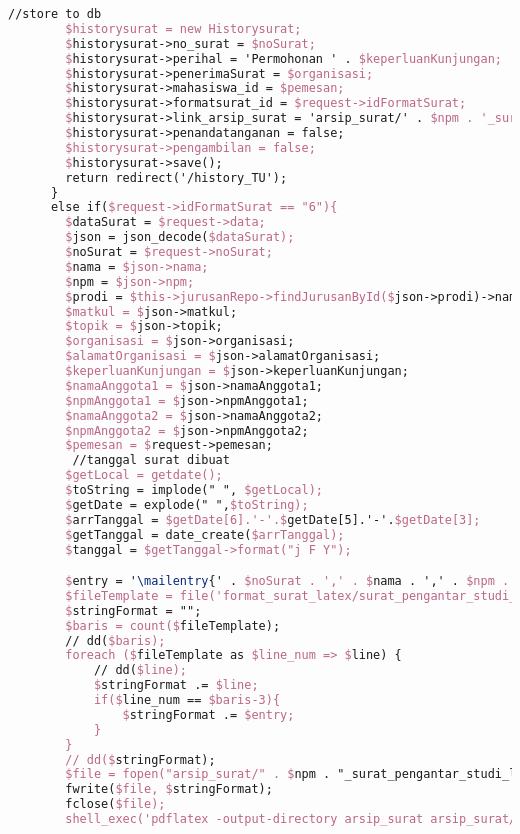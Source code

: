 \begin{lstlisting}[language=tex,basicstyle=\tiny,caption=HistorysuratController.php]
        //store to db
        $historysurat = new Historysurat;
        $historysurat->no_surat = $noSurat;
        $historysurat->perihal = 'Permohonan ' . $keperluanKunjungan;
        $historysurat->penerimaSurat = $organisasi;
        $historysurat->mahasiswa_id = $pemesan;
        $historysurat->formatsurat_id = $request->idFormatSurat;
        $historysurat->link_arsip_surat = 'arsip_surat/' . $npm . '_surat_pengantar_studi_lapangan_2orang.pdf';
        $historysurat->penandatanganan = false;
        $historysurat->pengambilan = false;
        $historysurat->save();
        return redirect('/history_TU');
      }
      else if($request->idFormatSurat == "6"){
        $dataSurat = $request->data;
        $json = json_decode($dataSurat);
        $noSurat = $request->noSurat;
        $nama = $json->nama;
        $npm = $json->npm;
        $prodi = $this->jurusanRepo->findJurusanById($json->prodi)->nama_jurusan;
        $matkul = $json->matkul;
        $topik = $json->topik;
        $organisasi = $json->organisasi;
        $alamatOrganisasi = $json->alamatOrganisasi;
        $keperluanKunjungan = $json->keperluanKunjungan;
        $namaAnggota1 = $json->namaAnggota1;
        $npmAnggota1 = $json->npmAnggota1;
        $namaAnggota2 = $json->namaAnggota2;
        $npmAnggota2 = $json->npmAnggota2;
        $pemesan = $request->pemesan;
         //tanggal surat dibuat
        $getLocal = getdate();
        $toString = implode(" ", $getLocal);
        $getDate = explode(" ",$toString);
        $arrTanggal = $getDate[6].'-'.$getDate[5].'-'.$getDate[3];
        $getTanggal = date_create($arrTanggal);
        $tanggal = $getTanggal->format("j F Y");

        $entry = '\mailentry{' . $noSurat . ',' . $nama . ',' . $npm . ',' . $prodi . ',' . $matkul . ',' . $topik . ',' . $organisasi . ',' . $alamatOrganisasi . ',' . $keperluanKunjungan . ',' . $namaAnggota1 . ',' . $npmAnggota1 . ',' . $namaAnggota2 . ',' . $npmAnggota2 . ',' . $tanggal .  '}';
        $fileTemplate = file('format_surat_latex/surat_pengantar_studi_lapangan_3orang.tex');
        $stringFormat = "";
        $baris = count($fileTemplate);
        // dd($baris);
        foreach ($fileTemplate as $line_num => $line) {
            // dd($line);
            $stringFormat .= $line;
            if($line_num == $baris-3){
                $stringFormat .= $entry;
            }
        }
        // dd($stringFormat);
        $file = fopen("arsip_surat/" . $npm . "_surat_pengantar_studi_lapangan_3orang.tex", "w");
        fwrite($file, $stringFormat);
        fclose($file);
        shell_exec('pdflatex -output-directory arsip_surat arsip_surat/' . $npm . '_surat_pengantar_studi_lapangan_3orang.tex');


\end{lstlisting}
